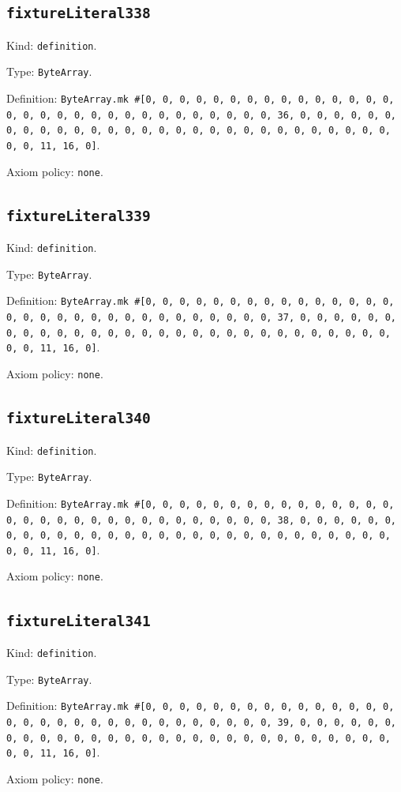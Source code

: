 \documentclass[11pt]{article}
\begin{document}
\subsection*{\texttt{fixtureLiteral338}}
\noindent Kind: \texttt{definition}.\par
\noindent Type: \texttt{ByteArray}.\par
\noindent Definition: \texttt{ByteArray.mk \#[0, 0, 0, 0, 0, 0, 0, 0, 0, 0, 0, 0, 0, 0, 0, 0, 0, 0, 0, 0, 0, 0, 0, 0, 0, 0, 0, 0, 0, 0, 0, 36, 0, 0, 0, 0, 0, 0, 0, 0, 0, 0, 0, 0, 0, 0, 0, 0, 0, 0, 0, 0, 0, 0, 0, 0, 0, 0, 0, 0, 0, 0, 0, 11, 16, 0]}.\par
\noindent Axiom policy: \texttt{none}.\par
\subsection*{\texttt{fixtureLiteral339}}
\noindent Kind: \texttt{definition}.\par
\noindent Type: \texttt{ByteArray}.\par
\noindent Definition: \texttt{ByteArray.mk \#[0, 0, 0, 0, 0, 0, 0, 0, 0, 0, 0, 0, 0, 0, 0, 0, 0, 0, 0, 0, 0, 0, 0, 0, 0, 0, 0, 0, 0, 0, 0, 37, 0, 0, 0, 0, 0, 0, 0, 0, 0, 0, 0, 0, 0, 0, 0, 0, 0, 0, 0, 0, 0, 0, 0, 0, 0, 0, 0, 0, 0, 0, 0, 11, 16, 0]}.\par
\noindent Axiom policy: \texttt{none}.\par
\subsection*{\texttt{fixtureLiteral340}}
\noindent Kind: \texttt{definition}.\par
\noindent Type: \texttt{ByteArray}.\par
\noindent Definition: \texttt{ByteArray.mk \#[0, 0, 0, 0, 0, 0, 0, 0, 0, 0, 0, 0, 0, 0, 0, 0, 0, 0, 0, 0, 0, 0, 0, 0, 0, 0, 0, 0, 0, 0, 0, 38, 0, 0, 0, 0, 0, 0, 0, 0, 0, 0, 0, 0, 0, 0, 0, 0, 0, 0, 0, 0, 0, 0, 0, 0, 0, 0, 0, 0, 0, 0, 0, 11, 16, 0]}.\par
\noindent Axiom policy: \texttt{none}.\par
\subsection*{\texttt{fixtureLiteral341}}
\noindent Kind: \texttt{definition}.\par
\noindent Type: \texttt{ByteArray}.\par
\noindent Definition: \texttt{ByteArray.mk \#[0, 0, 0, 0, 0, 0, 0, 0, 0, 0, 0, 0, 0, 0, 0, 0, 0, 0, 0, 0, 0, 0, 0, 0, 0, 0, 0, 0, 0, 0, 0, 39, 0, 0, 0, 0, 0, 0, 0, 0, 0, 0, 0, 0, 0, 0, 0, 0, 0, 0, 0, 0, 0, 0, 0, 0, 0, 0, 0, 0, 0, 0, 0, 11, 16, 0]}.\par
\noindent Axiom policy: \texttt{none}.\par
\end{document}
